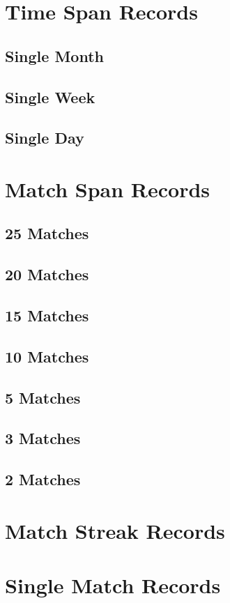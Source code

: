   \chapter{Time Span Records}
    \section{Single Month}
    \section{Single Week}
    \section{Single Day}
  \chapter{Match Span Records}
    \section{25 Matches}
    \section{20 Matches}
    \section{15 Matches}
    \section{10 Matches}
    \section{5 Matches}
    \section{3 Matches}
    \section{2 Matches}
  \chapter{Match Streak Records}
  \chapter{Single Match Records}
